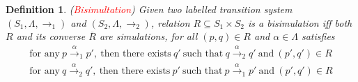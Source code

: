 \documentclass{article}
\newtheorem{lemma}[theorem]{Lemma}
\newtheorem{definition}[theorem]{Definition}
\newcommand{\redt}[1]{\textcolor{red}{#1}}
\begin{document}


\begin{definition}
\rm (\redt{Bisimultation}) Given two labelled transition system $(S_1, \Lambda, \to_1)$ and $(S_2, \Lambda, \to_2)$, relation $R \subseteq S_1 \times S_2$ is a bisimulation iff both $R$ and its converse $\overline{R}$ are simulations, for all $(p,q) \in R$ and $\alpha \in \Lambda$ satisfies
\[
	\begin{gathered}
	\text{for any}~p \xrightarrow{\alpha}_1 p', ~\text{then there exists}~ q'~\text{such that}~q \xrightarrow{\alpha}_2 q'~\text{and}~(p',q') \in R \\
	\text{for any}~q \xrightarrow{\alpha}_2 q', ~\text{then there exists}~ p'~\text{such that}~p \xrightarrow{\alpha}_1 p'~\text{and}~(p',q') \in R
	\end{gathered} 	
\]
\end{definition}

\end{document}
